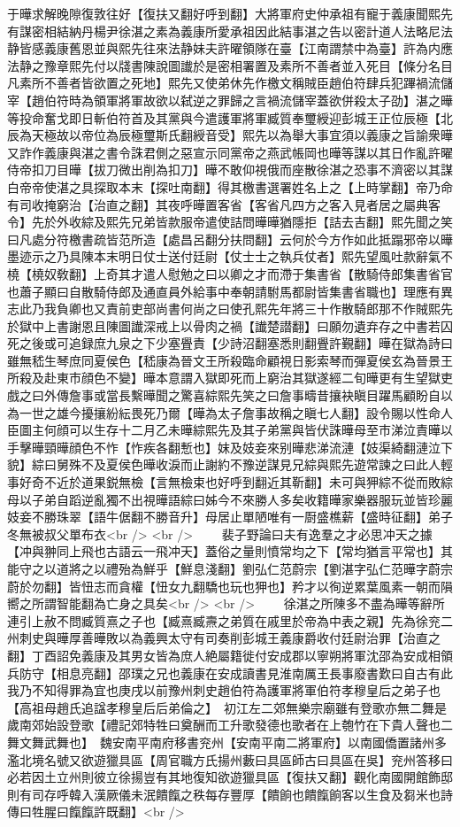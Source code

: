 于曄求解晚隙復敦往好【復扶又翻好呼到翻】大將軍府史仲承祖有寵于義康聞熙先有謀密相結納丹楊尹徐湛之素為義康所愛承祖因此結事湛之告以密計道人法略尼法静皆感義康舊恩並與熙先往來法静妹夫許曜領隊在臺【江南謂禁中為臺】許為内應法静之豫章熙先付以牋書陳說圖䜟於是密相署置及素所不善者並入死目【條分名目凡素所不善者皆欲置之死地】熙先又使弟休先作檄文稱賊臣趙伯符肆兵犯蹕禍流儲宰【趙伯符時為領軍將軍故欲以弑逆之罪歸之言禍流儲宰蓋欲併殺太子劭】湛之曄等投命奮戈即日斬伯符首及其黨與今遣護軍將軍臧質奉璽綬迎彭城王正位辰極【北辰為天極故以帝位為辰極璽斯氏翻綬音受】熙先以為舉大事宜須以義康之旨諭衆曄又詐作義康與湛之書令誅君側之惡宣示同黨帝之燕武帳岡也曄等謀以其日作亂許曜侍帝扣刀目曄【拔刀微出削為扣刀】曄不敢仰視俄而座散徐湛之恐事不濟密以其謀白帝帝使湛之具探取本末【探吐南翻】得其檄書選署姓名上之【上時掌翻】帝乃命有司收掩窮治【治直之翻】其夜呼曄置客省【客省凡四方之客入見者居之屬典客令】先於外收綜及熙先兄弟皆款服帝遣使詰問曄曄猶隱拒【詰去吉翻】熙先聞之笑曰凡處分符檄書疏皆范所造【處昌呂翻分扶問翻】云何於今方作如此抵蹋邪帝以曄墨迹示之乃具陳本末明日仗士送付廷尉【仗士士之執兵仗者】熙先望風吐款辭氣不橈【橈奴敎翻】上奇其才遣人慰勉之曰以卿之才而滯于集書省【散騎侍郎集書省官也蕭子顯曰自散騎侍郎及通直員外給事中奉朝請駙馬都尉皆集書省職也】理應有異志此乃我負卿也又責前吏部尚書何尚之曰使孔熙先年將三十作散騎郎那不作賊熙先於獄中上書謝恩且陳圖䜟深戒上以骨肉之禍【䜟楚譛翻】曰願勿遺弃存之中書若囚死之後或可追録庶九泉之下少塞舋責【少詩沼翻塞悉則翻舋許覲翻】曄在獄為詩曰雖無嵇生琴庶同夏侯色【嵇康為晉文王所殺臨命顧視日影索琴而彈夏侯玄為晉景王所殺及赴東市顔色不變】曄本意謂入獄即死而上窮治其獄遂經二旬曄更有生望獄吏戲之曰外傳詹事或當長繫曄聞之驚喜綜熙先笑之曰詹事疇昔攘袂瞋目躍馬顧盼自以為一世之雄今擾攘紛紜畏死乃爾【曄為太子詹事故稱之瞋七人翻】設令賜以性命人臣圖主何顔可以生存十二月乙未曄綜熙先及其子弟黨與皆伏誅曄母至市涕泣責曄以手擊曄頸曄顔色不怍【怍疾各翻慙也】妺及妓妾來别曄悲涕流漣【妓渠綺翻漣泣下貌】綜曰舅殊不及夏侯色曄收淚而止謝約不豫逆謀見兄綜與熙先遊常諫之曰此人輕事好奇不近於道果鋭無檢【言無檢束也好呼到翻近其靳翻】未可與狎綜不從而敗綜母以子弟自蹈逆亂獨不出視曄語綜曰姊今不來勝人多矣收籍曄家樂器服玩並皆珍麗妓妾不勝珠翠【語牛倨翻不勝音升】母居止單陋唯有一㕑盛樵薪【盛時征翻】弟子冬無被叔父單布衣<br />
<br />
　　裴子野論曰夫有逸羣之才必思冲天之據【冲與翀同上飛也古語云一飛冲天】蓋俗之量則憤常均之下【常均猶言平常也】其能守之以道將之以禮殆為鮮乎【鮮息淺翻】劉弘仁范蔚宗【劉湛字弘仁范曄字蔚宗蔚於勿翻】皆忸志而貪權【忸女九翻驕也玩也狎也】矜才以徇逆累葉風素一朝而隕嚮之所謂智能翻為亡身之具矣<br />
<br />
　　徐湛之所陳多不盡為曄等辭所連引上赦不問臧質熹之子也【臧熹臧燾之弟質在戚里於帝為中表之親】先為徐兖二州刺史與曄厚善曄敗以為義興太守有司奏削彭城王義康爵收付廷尉治罪【治直之翻】丁酉詔免義康及其男女皆為庶人絶屬籍徙付安成郡以寧朔將軍沈邵為安成相領兵防守【相息亮翻】邵璞之兄也義康在安成讀書見淮南厲王長事廢書歎曰自古有此我乃不知得罪為宜也庚戌以前豫州刺史趙伯符為護軍將軍伯符孝穆皇后之弟子也【高祖母趙氏追諡孝穆皇后后弟倫之】　初江左二郊無樂宗廟雖有登歌亦無二舞是歲南郊始設登歌【禮記郊特牲曰奠酬而工升歌發德也歌者在上匏竹在下貴人聲也二舞文舞武舞也】　魏安南平南府移書兖州【安南平南二將軍府】以南國僑置諸州多濫北境名號又欲遊獵具區【周官職方氏揚州藪曰具區師古曰具區在吳】兖州答移曰必若因土立州則彼立徐揚豈有其地復知欲遊獵具區【復扶又翻】觀化南國開館飾邸則有司存呼韓入漢厥儀未泯饋餼之秩每存豐厚【饋餉也饋餼餉客以生食及芻米也詩傳曰牲腥曰餼餼許既翻】<br />
